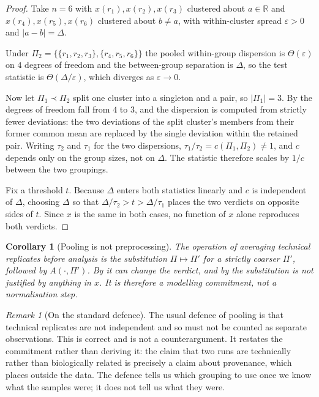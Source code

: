 \documentclass[11pt,a4paper]{article}
\newtheorem{corollary}[theorem]{Corollary}
\theoremstyle{definition}
\theoremstyle{remark}
\newtheorem{remark}[theorem]{Remark}
\newcommand{\Part}{\Pi}                      %
\begin{document}
\begin{proof}
Take $n=6$ with $x(r_1),x(r_2),x(r_3)$ clustered about $a \in \mathbb{R}$
and $x(r_4),x(r_5),x(r_6)$ clustered about $b \neq a$, with
within-cluster spread $\varepsilon > 0$ and $|a-b| = \Delta$.

Under $\Part_2 = \{\{r_1,r_2,r_3\},\{r_4,r_5,r_6\}\}$ the pooled
within-group dispersion is $\Theta(\varepsilon)$ on $4$ degrees of
freedom and the between-group separation is $\Delta$, so the test
statistic is $\Theta(\Delta/\varepsilon)$, which diverges as
$\varepsilon \to 0$.

Now let $\Part_1 \prec \Part_2$ split one cluster into a singleton and a
pair, so $|\Part_1| = 3$. By  the degrees of freedom fall
from $4$ to $3$, and the dispersion is computed from strictly fewer
deviations: the two deviations of the split cluster's members from their
former common mean are replaced by the single deviation within the
retained pair. Writing $\tau_2$ and $\tau_1$ for the two dispersions,
$\tau_1/\tau_2 = c(\Part_1,\Part_2) \neq 1$, and $c$ depends only on the
group sizes, not on $\Delta$. The statistic therefore scales by
$1/c$ between the two groupings.

Fix a threshold $t$. Because $\Delta$ enters both statistics linearly and
$c$ is independent of $\Delta$, choosing $\Delta$ so that
$\Delta/\tau_2 > t > \Delta/\tau_1$ places the two verdicts on opposite
sides of $t$. Since $x$ is the same in both cases, no function of $x$
alone reproduces both verdicts.
\end{proof}

\begin{corollary}[Pooling is not preprocessing]\label{cor:pooling}
The operation of averaging technical replicates before analysis is the
substitution $\Part \mapsto \Part'$ for a strictly coarser $\Part'$,
followed by $A(\cdot,\Part')$. By  it can
change the verdict, and by  the substitution is not
justified by anything in $x$. It is therefore a modelling commitment, not
a normalisation step.
\end{corollary}

\begin{remark}[On the standard defence]\label{rem:defence}
The usual defence of pooling is that technical replicates are not
independent and so must not be counted as separate observations. This is
correct and is not a counterargument. It restates the commitment rather
than deriving it: the claim that two runs are technically rather than
biologically related is precisely a claim about provenance, which
 places outside the data. The defence tells us which
grouping to use once we know what the samples were; it does not tell us
what they were.
\end{remark}
\end{document}
